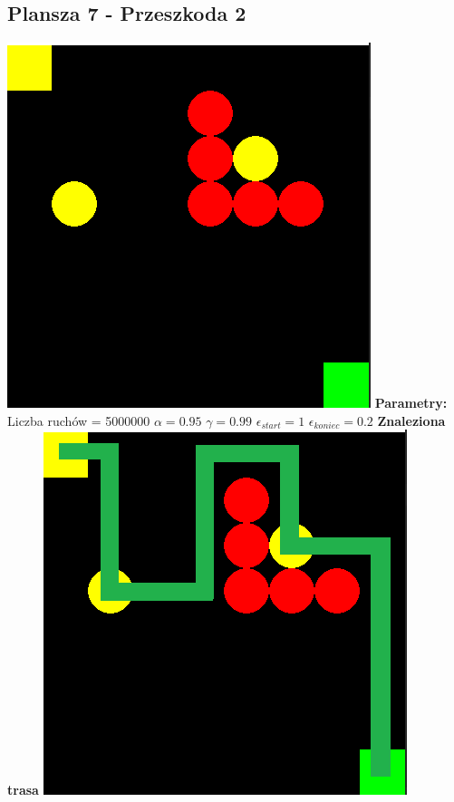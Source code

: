 \documentclass[a4paper,12pt]{article}
\begin{document}
\subsection{Plansza 7 - Przeszkoda 2}
\includegraphics[scale=0.73]{testy/plansza7.png} \newline
\textbf{Parametry:}
Liczba ruchów = 5000000
\newline \(\alpha = 0.95\)
\newline \(\gamma = 0.99\)
\newline \(\epsilon_{start} = 1\)
\newline \(\epsilon_{koniec} = 0.2\) \newline \newline
\textbf{\Large{Znaleziona trasa}} \newline \newline
\includegraphics[scale=0.73]{testy/plansza7trasa.png} \newline \newline
\end{document}
